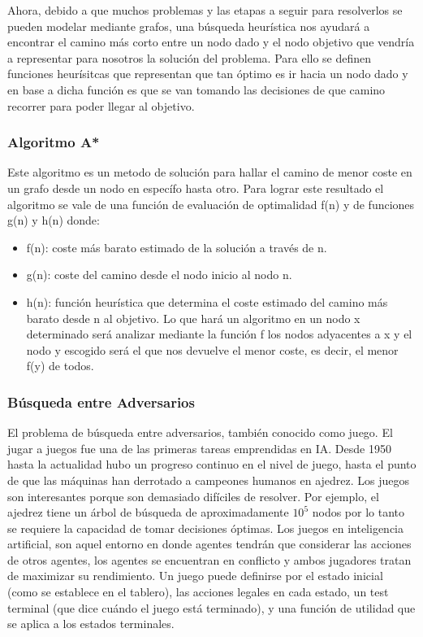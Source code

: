 \documentclass[a4paper]{article}
\begin{document}
Ahora, debido a que muchos problemas y las etapas a seguir para resolverlos se pueden modelar mediante grafos, una búsqueda heurística nos ayudará a encontrar el camino más corto entre un nodo dado y el nodo objetivo que vendría a representar para nosotros la solución del problema. Para ello se definen funciones heurísitcas que representan que tan óptimo es ir hacia un nodo dado y en base a dicha función es que se van tomando las decisiones de que camino recorrer para poder llegar al objetivo.

\subsubsection*{Algoritmo A*}
Este algoritmo es un metodo de solución para hallar el camino de menor coste en un grafo desde un nodo en específo hasta otro. Para lograr este resultado el algoritmo se vale de una función de evaluación de optimalidad f(n) y de funciones g(n) y h(n) donde:
\begin{itemize}
\item f(n): coste más barato estimado de la solución a través de n.
\item g(n): coste del camino desde el nodo inicio al nodo n.
\item h(n): función heurística que determina el coste estimado del camino más barato desde n al objetivo. Lo que hará un algoritmo en un nodo x determinado será analizar mediante la función f los nodos adyacentes a x y el nodo y escogido será el que nos devuelve el menor coste, es decir, el menor f(y) de todos.
\end{itemize}


\subsubsection{B\'usqueda entre Adversarios}
El problema de búsqueda entre adversarios, también conocido como juego. El jugar a juegos fue una de las primeras tareas emprendidas en IA. Desde 1950 hasta la actualidad hubo un progreso continuo en el nivel de juego, hasta el punto de que las máquinas han derrotado a campeones humanos en ajedrez. Los juegos son interesantes porque son demasiado difíciles de resolver. Por ejemplo, el ajedrez tiene un árbol de búsqueda de aproximadamente $10^5$ nodos por lo tanto se requiere la capacidad de tomar decisiones óptimas.
Los juegos en inteligencia artificial, son aquel entorno en donde agentes tendrán que considerar las acciones de otros agentes, los agentes se encuentran en conflicto y ambos jugadores tratan de maximizar su rendimiento. Un juego puede definirse por el estado inicial (como se establece en el tablero), las acciones legales en cada estado, un test terminal (que dice cuándo el juego está terminado), y una función de utilidad que se aplica a los estados terminales.
\end{document}
